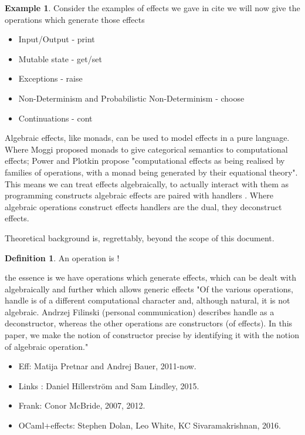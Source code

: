 \documentclass[a4paper,10pt]{article}
\theoremstyle{definition}
\newtheorem{definition}{Definition}[section]
\newtheorem{example}{Example}[section]
\begin{document}
\begin{example}
    Consider the examples of effects we gave in cite
    we will now give the operations which generate those effects
    \begin{itemize}
        \item Input/Output - print
        \item Mutable state - get/set
        \item Exceptions - raise
        \item Non-Determinism and Probabilistic Non-Determinism - choose
        \item Continuations - cont
    \end{itemize}
\end{example}
Algebraic effects, like monads, can be used to model effects in a pure language.
Where Moggi \cite{moggi1989computational} proposed monads to give categorical semantics to computational effects;
Power and Plotkin \cite{Plotkin:2002dw} propose "computational effects as being realised by
families of operations, with a monad being generated by their equational theory".
This means we can treat effects algebraically,
to actually interact with them as programming constructs algebraic effects are paired with
handlers \cite{plotkin2009handlers}.
Where algebraic operations construct effects handlers are the dual, they deconstruct effects.

Theoretical background is, regrettably, beyond the scope of this document.
\begin{definition}
    An operation is !
\end{definition}

the essence is we have operations which generate effects,
which can be dealt with algebraically %
and further which allows generic effects
"Of the various operations, handle is of a different computational character and, although natural, it is not algebraic. Andrzej Filinski (personal communication) describes handle as a deconstructor, whereas the other operations are constructors (of effects). In this paper, we make the notion of constructor precise by identifying it with the notion of algebraic operation."

\begin{itemize}
    \item Eff: Matija Pretnar and Andrej Bauer, 2011-now.
    \item Links : Daniel Hillerström and Sam Lindley, 2015.
    \item Frank: Conor McBride, 2007, 2012.
    \item OCaml+effects: Stephen Dolan, Leo White, KC Sivaramakrishnan, 2016.
\end{itemize}
\end{document}
